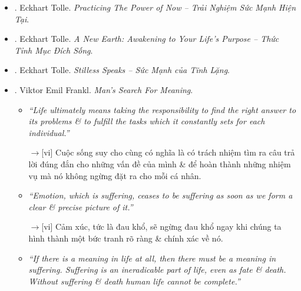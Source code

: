 \documentclass[12pt,oneside]{book}
\begin{document}
\begin{itemize}
\begin{itemize}
		{\sf[en]$\to$[vi]} Bước quan trọng nhất trên hành trình hướng tới giác ngộ của bạn là: Học cách loại bỏ sự đồng nhất khỏi tâm trí của bạn. Mỗi khi bạn tạo ra một khoảng trống trong dòng tâm thức, ánh sáng ý thức của bạn ngày càng mạnh mẽ hơn.
		
		\item {\it``The beginning of freedom is the realization that you are not the possessing entity -- the thinker. Knowing this enables you to observe the entity. The moment you start watching the thinker, a higher level of consciousness becomes activated.''}
		
		{\sf[en]$\to$[vi]} Sự khởi đầu của tự do là việc nhận ra rằng bạn không phải là thực thể sở hữu - người suy nghĩ. Biết được điều này cho phép bạn quan sát thực thể. Khoảnh khắc bạn bắt đầu quan sát người suy nghĩ, mức độ ý thức cao hơn sẽ được kích hoạt.
	\end{itemize}
	Với bản dịch tiếng Việt:
	\item \cite{Tolle_practice_now_VN}. {\sc Eckhart Tolle}. {\it Practicing The Power of Now -- Trải Nghiệm Sức Mạnh Hiện Tại}.
	\item \cite{Tolle_earth_VN}. {\sc Eckhart Tolle}. {\it A New Earth: Awakening to Your Life's Purpose -- Thức Tỉnh Mục Đích Sống}.
	\item \cite{Tolle_stillness_VN}. {\sc Eckhart Tolle}. {\it Stilless Speaks -- Sức Mạnh của Tĩnh Lặng}.
	\item \cite{Frankl_meaning,Frankl_meaning_revised}. {\sc Viktor Emil Frankl}. {\it Man's Search For Meaning}.
	\begin{itemize}
		\item {\it``Life ultimately means taking the responsibility to find the right answer to its problems \& to fulfill the tasks which it constantly sets for each individual.''}
		
		{\sf[en]$\to$[vi]} Cuộc sống suy cho cùng có nghĩa là có trách nhiệm tìm ra câu trả lời đúng đắn cho những vấn đề của mình \& để hoàn thành những nhiệm vụ mà nó không ngừng đặt ra cho mỗi cá nhân.
		
		\item {\it``Emotion, which is suffering, ceases to be suffering as soon as we form a clear \& precise picture of it.''}
		
		{\sf[en]$\to$[vi]} Cảm xúc, tức là đau khổ, sẽ ngừng đau khổ ngay khi chúng ta hình thành một bức tranh rõ ràng \& chính xác về nó.
		
		\item {\it``If there is a meaning in life at all, then there must be a meaning in suffering. Suffering is an ineradicable part of life, even as fate \& death. Without suffering \& death human life cannot be complete.''}
		

\end{itemize}
\end{itemize}
\end{document}
